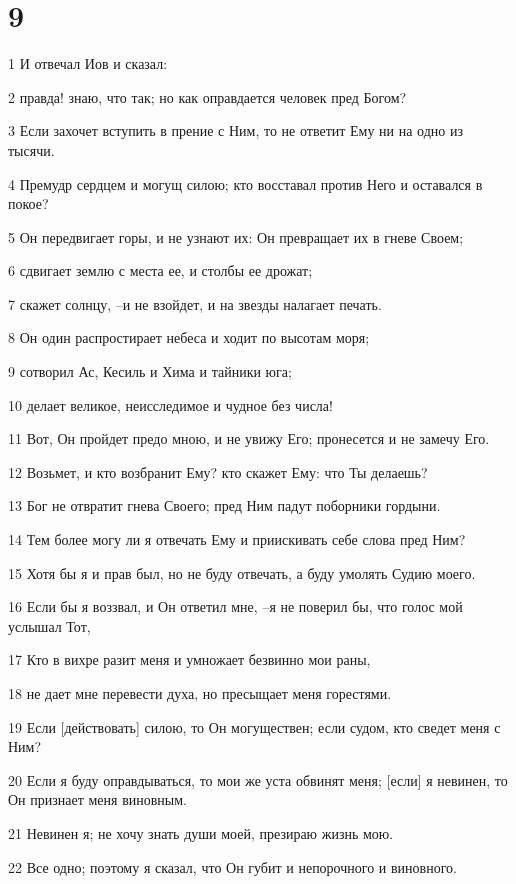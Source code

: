 \chapter{9}

\par 1 И отвечал Иов и сказал:
\par 2 правда! знаю, что так; но как оправдается человек пред Богом?
\par 3 Если захочет вступить в прение с Ним, то не ответит Ему ни на одно из тысячи.
\par 4 Премудр сердцем и могущ силою; кто восставал против Него и оставался в покое?
\par 5 Он передвигает горы, и не узнают их: Он превращает их в гневе Своем;
\par 6 сдвигает землю с места ее, и столбы ее дрожат;
\par 7 скажет солнцу, --и не взойдет, и на звезды налагает печать.
\par 8 Он один распростирает небеса и ходит по высотам моря;
\par 9 сотворил Ас, Кесиль и Хима и тайники юга;
\par 10 делает великое, неисследимое и чудное без числа!
\par 11 Вот, Он пройдет предо мною, и не увижу Его; пронесется и не замечу Его.
\par 12 Возьмет, и кто возбранит Ему? кто скажет Ему: что Ты делаешь?
\par 13 Бог не отвратит гнева Своего; пред Ним падут поборники гордыни.
\par 14 Тем более могу ли я отвечать Ему и приискивать себе слова пред Ним?
\par 15 Хотя бы я и прав был, но не буду отвечать, а буду умолять Судию моего.
\par 16 Если бы я воззвал, и Он ответил мне, --я не поверил бы, что голос мой услышал Тот,
\par 17 Кто в вихре разит меня и умножает безвинно мои раны,
\par 18 не дает мне перевести духа, но пресыщает меня горестями.
\par 19 Если [действовать] силою, то Он могуществен; если судом, кто сведет меня с Ним?
\par 20 Если я буду оправдываться, то мои же уста обвинят меня; [если] я невинен, то Он признает меня виновным.
\par 21 Невинен я; не хочу знать души моей, презираю жизнь мою.
\par 22 Все одно; поэтому я сказал, что Он губит и непорочного и виновного.
